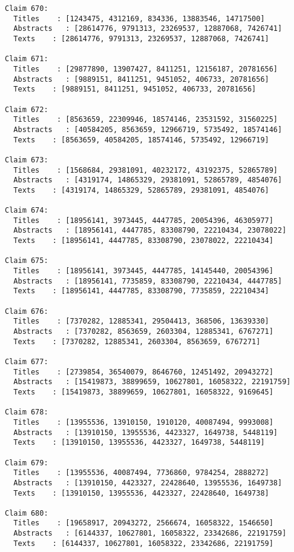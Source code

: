 \documentclass[11pt]{article}
\begin{document}
\begin{Verbatim}[commandchars=\\\{\}]
Claim 670:
  Titles    : [1243475, 4312169, 834336, 13883546, 14717500]
  Abstracts   : [28614776, 9791313, 23269537, 12887068, 7426741]
  Texts    : [28614776, 9791313, 23269537, 12887068, 7426741]

Claim 671:
  Titles    : [29877890, 13907427, 8411251, 12156187, 20781656]
  Abstracts   : [9889151, 8411251, 9451052, 406733, 20781656]
  Texts    : [9889151, 8411251, 9451052, 406733, 20781656]

Claim 672:
  Titles    : [8563659, 22309946, 18574146, 23531592, 31560225]
  Abstracts   : [40584205, 8563659, 12966719, 5735492, 18574146]
  Texts    : [8563659, 40584205, 18574146, 5735492, 12966719]

Claim 673:
  Titles    : [1568684, 29381091, 40232172, 43192375, 52865789]
  Abstracts   : [4319174, 14865329, 29381091, 52865789, 4854076]
  Texts    : [4319174, 14865329, 52865789, 29381091, 4854076]

Claim 674:
  Titles    : [18956141, 3973445, 4447785, 20054396, 46305977]
  Abstracts   : [18956141, 4447785, 83308790, 22210434, 23078022]
  Texts    : [18956141, 4447785, 83308790, 23078022, 22210434]

Claim 675:
  Titles    : [18956141, 3973445, 4447785, 14145440, 20054396]
  Abstracts   : [18956141, 7735859, 83308790, 22210434, 4447785]
  Texts    : [18956141, 4447785, 83308790, 7735859, 22210434]

Claim 676:
  Titles    : [7370282, 12885341, 29504413, 368506, 13639330]
  Abstracts   : [7370282, 8563659, 2603304, 12885341, 6767271]
  Texts    : [7370282, 12885341, 2603304, 8563659, 6767271]

Claim 677:
  Titles    : [2739854, 36540079, 8646760, 12451492, 20943272]
  Abstracts   : [15419873, 38899659, 10627801, 16058322, 22191759]
  Texts    : [15419873, 38899659, 10627801, 16058322, 9169645]

Claim 678:
  Titles    : [13955536, 13910150, 1910120, 40087494, 9993008]
  Abstracts   : [13910150, 13955536, 4423327, 1649738, 5448119]
  Texts    : [13910150, 13955536, 4423327, 1649738, 5448119]

Claim 679:
  Titles    : [13955536, 40087494, 7736860, 9784254, 2888272]
  Abstracts   : [13910150, 4423327, 22428640, 13955536, 1649738]
  Texts    : [13910150, 13955536, 4423327, 22428640, 1649738]

Claim 680:
  Titles    : [19658917, 20943272, 2566674, 16058322, 1546650]
  Abstracts   : [6144337, 10627801, 16058322, 23342686, 22191759]
  Texts    : [6144337, 10627801, 16058322, 23342686, 22191759]


\end{Verbatim}
\end{document}
